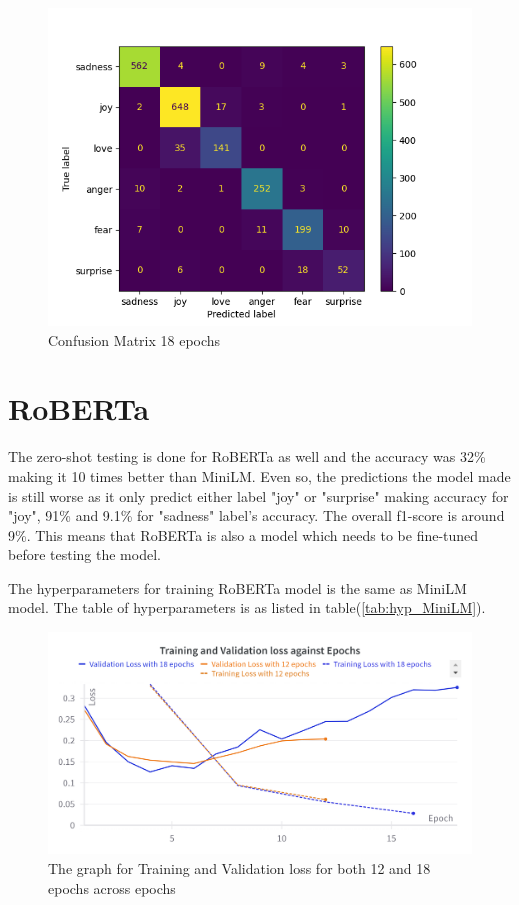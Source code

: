 \begin{figure}[h!]
\begin{minipage}{.5\textwidth}
        \centering
        \includegraphics[width=1\linewidth]{Figures/conf_metrix_minilm_18_epochs.png}
        \caption{Confusion Matrix 18 epochs}
        \label{fig:conf_18}
    \end{minipage}%
\end{figure}

\section{RoBERTa}

The zero-shot testing is done for RoBERTa as well and the accuracy was 32\% making it 10 times better than MiniLM. Even so, the predictions the model made is still worse as it only predict either label "joy" or "surprise" making accuracy for "joy", 91\% and 9.1\% for "sadness" label's accuracy. The overall f1-score is around 9\%. This means that RoBERTa is also a model which needs to be fine-tuned before testing the model.

The hyperparameters for training RoBERTa model is the same as MiniLM model. The table of hyperparameters is as listed in table(\ref{tab:hyp_MiniLM}).\bigskip
\bigskip
\bigskip
\bigskip
\begin{figure}[h!]
    \centerline{\includegraphics[scale=0.17]{Figures/val_train_loss_12_18 _epochs.png}}
    \caption{The graph for Training and Validation loss for both 12 and 18 epochs across epochs}
    \label{fig:val_train_loss_rob}
\end{figure}

